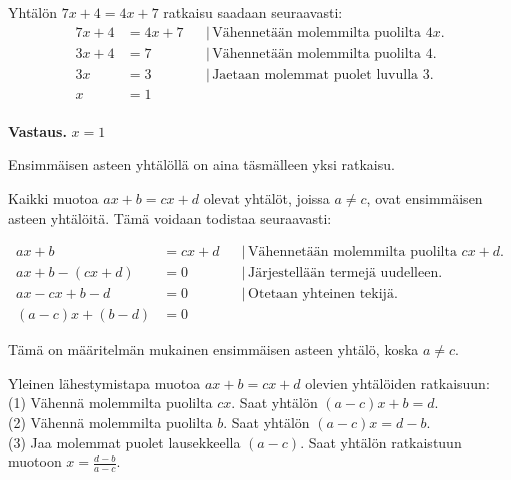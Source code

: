 
\begin{esimerkki}
Yhtälön $7x+4=4x+7$ ratkaisu saadaan seuraavasti:
\begin{align*}
7x+4 &= 4x+7 & &| \, \text{Vähennetään molemmilta puolilta $4x$.} \\
3x+4 &= 7 & &| \, \text{Vähennetään molemmilta puolilta 4.} \\
3x &= 3 & &| \, \text{Jaetaan molemmat puolet luvulla 3.} \\
x &= 1 & & \\
\end{align*}

\textbf{Vastaus.} $x=1$
\end{esimerkki}

Ensimmäisen asteen yhtälöllä on aina täsmälleen yksi ratkaisu.

Kaikki muotoa $ax+b=cx+d$ olevat yhtälöt, joissa $a \neq c$, ovat ensimmäisen asteen yhtälöitä. Tämä voidaan todistaa seuraavasti:

\begin{align*}
ax+b &= cx+d & &| \, \text{Vähennetään molemmilta puolilta $cx+d$}. \\
ax+b - (cx+d) &= 0 & &| \, \text{Järjestellään termejä uudelleen.} \\
ax - cx + b - d &= 0 & &| \, \text{Otetaan yhteinen tekijä.} \\
(a-c)x + (b-d) &= 0 & &
\end{align*}

Tämä on määritelmän mukainen ensimmäisen asteen yhtälö, koska $a \neq c$.

\begin{esimerkki}
Yleinen lähestymistapa muotoa $ax+b = cx+d$ olevien yhtälöiden ratkaisuun: \\
(1) Vähennä molemmilta puolilta $cx$. Saat yhtälön $(a-c)x + b = d$. \\
(2) Vähennä molemmilta puolilta $b$. Saat yhtälön $(a-c)x = d-b$. \\
(3) Jaa molemmat puolet lausekkeella $(a-c)$. Saat yhtälön ratkaistuun muotoon $x = \frac{d-b}{a-c}$. 
\end{esimerkki}
